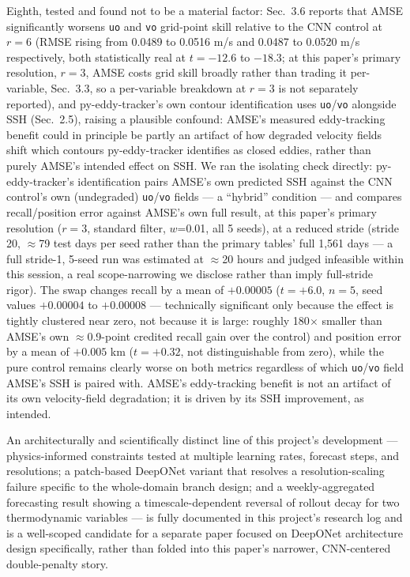 \documentclass[11pt]{article}
\begin{document}
Eighth, tested and found not to be a material factor: Sec.~3.6 reports that AMSE significantly worsens \texttt{uo} and \texttt{vo} grid-point skill relative to the CNN control at $r=6$ (RMSE rising from 0.0489 to 0.0516 m/s and 0.0487 to 0.0520 m/s respectively, both statistically real at $t=-12.6$ to $-18.3$; at this paper's primary resolution, $r=3$, AMSE costs grid skill broadly rather than trading it per-variable, Sec.~3.3, so a per-variable breakdown at $r=3$ is not separately reported), and py-eddy-tracker's own contour identification uses \texttt{uo}/\texttt{vo} alongside SSH (Sec.~2.5), raising a plausible confound: AMSE's measured eddy-tracking benefit could in principle be partly an artifact of how degraded velocity fields shift which contours py-eddy-tracker identifies as closed eddies, rather than purely AMSE's intended effect on SSH. We ran the isolating check directly: py-eddy-tracker's identification pairs AMSE's own predicted SSH against the CNN control's own (undegraded) \texttt{uo}/\texttt{vo} fields --- a ``hybrid'' condition --- and compares recall/position error against AMSE's own full result, at this paper's primary resolution ($r=3$, standard filter, $w$=0.01, all 5 seeds), at a reduced stride (stride 20, $\approx$79 test days per seed rather than the primary tables' full 1,561 days --- a full stride-1, 5-seed run was estimated at $\approx$20 hours and judged infeasible within this session, a real scope-narrowing we disclose rather than imply full-stride rigor). The swap changes recall by a mean of $+0.00005$ ($t=+6.0$, $n=5$, seed values $+0.00004$ to $+0.00008$ --- technically significant only because the effect is tightly clustered near zero, not because it is large: roughly 180$\times$ smaller than AMSE's own $\approx$0.9-point credited recall gain over the control) and position error by a mean of $+0.005$ km ($t=+0.32$, not distinguishable from zero), while the pure control remains clearly worse on both metrics regardless of which \texttt{uo}/\texttt{vo} field AMSE's SSH is paired with. AMSE's eddy-tracking benefit is not an artifact of its own velocity-field degradation; it is driven by its SSH improvement, as intended.

An architecturally and scientifically distinct line of this project's development --- physics-informed constraints tested at multiple learning rates, forecast steps, and resolutions; a patch-based DeepONet variant that resolves a resolution-scaling failure specific to the whole-domain branch design; and a weekly-aggregated forecasting result showing a timescale-dependent reversal of rollout decay for two thermodynamic variables --- is fully documented in this project's research log and is a well-scoped candidate for a separate paper focused on DeepONet architecture design specifically, rather than folded into this paper's narrower, CNN-centered double-penalty story.
\end{document}
